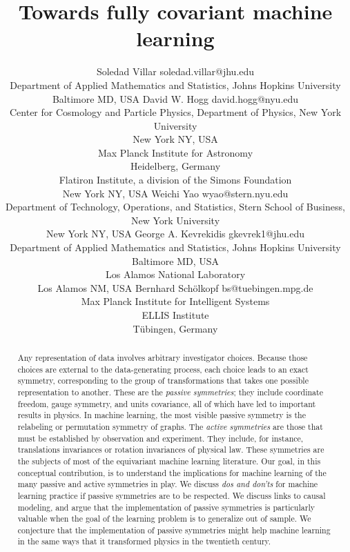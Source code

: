 \documentclass[]{article} %
\title{Towards fully covariant machine learning}
\author{\name Soledad Villar\footnotemark[1]{} \email soledad.villar@jhu.edu\\
      \addr Department of Applied Mathematics and Statistics, Johns Hopkins University\\
            Baltimore MD, USA
      \AND
      \name David W. Hogg\footnotemark[1]{} \email david.hogg@nyu.edu\\
      \addr Center for Cosmology and Particle Physics, Department of Physics, New York University\\
            New York NY, USA\\[1ex]
            Max Planck Institute for Astronomy\\
            Heidelberg, Germany\\[1ex]
            Flatiron Institute, a division of the Simons Foundation\\
            New York NY, USA
      \AND
      \name Weichi Yao \email wyao@stern.nyu.edu\\
      \addr Department of Technology, Operations, and Statistics, Stern School of Business, New York University\\
            New York NY, USA
      \AND
      \name George A. Kevrekidis \email gkevrek1@jhu.edu\\
      \addr Department of Applied Mathematics and Statistics, Johns Hopkins University\\
            Baltimore MD, USA\\[1ex]
            Los Alamos National Laboratory\\
            Los Alamos NM, USA
      \AND
      \name Bernhard Sch\"olkopf \email bs@tuebingen.mpg.de\\
      \addr Max Planck Institute for Intelligent Systems\\ 
      ELLIS Institute\\
            T\"ubingen, Germany
     }
\begin{document}
\maketitle%

\begin{abstract}
Any representation of data involves arbitrary investigator choices.
Because those choices are external to the data-generating process, each choice leads to an exact symmetry, corresponding to the group of transformations that takes one possible representation to another.
These are the \emph{passive symmetries}; they include coordinate freedom, gauge symmetry, and units covariance, all of which have led to important results in physics.
In machine learning, the most visible passive symmetry is the relabeling or permutation symmetry of graphs.
The \emph{active symmetries} are those that must be established by observation and experiment.
They include, for instance, translations invariances or rotation invariances of physical law. 
These symmetries are the subjects of most of the equivariant machine learning literature.
Our goal, in this conceptual contribution, is to understand the implications for machine learning of the many passive and active symmetries in play.
We discuss \emph{dos and don'ts} for machine learning practice if passive symmetries are to be respected.
We discuss links to causal modeling, and argue that the implementation of passive symmetries is particularly valuable when the goal of the learning problem is to generalize out of sample.
We conjecture that the implementation of passive symmetries might help machine learning in the same ways that it transformed physics in the twentieth century.
\end{abstract}
\end{document}
